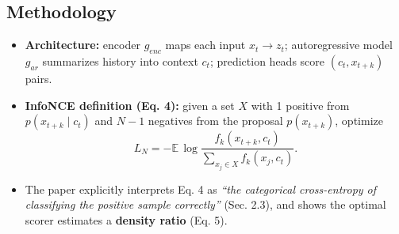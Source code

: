 \documentclass{article}
\begin{document}
\subsection*{Methodology}
\begin{itemize}
  \item \textbf{Architecture:} encoder $g_{enc}$ maps each input $x_t \to z_t$; autoregressive model $g_{ar}$ summarizes history into context $c_t$; prediction heads score $(c_t, x_{t+k})$ pairs.
  \item \textbf{InfoNCE definition (Eq. 4):} given a set $X$ with 1 positive from $p(x_{t+k}\mid c_t)$ and $N-1$ negatives from the proposal $p(x_{t+k})$, optimize
  \[
    L_N = -\mathbb{E}\, \log \frac{f_k(x_{t+k}, c_t)}{\sum_{x_j\in X} f_k(x_j, c_t)}.
  \]
  \item The paper explicitly interprets Eq. 4 as \emph{``the categorical cross-entropy of classifying the positive sample correctly''} (Sec. 2.3), and shows the optimal scorer estimates a \textbf{density ratio} (Eq. 5).
\end{itemize}
\end{document}
